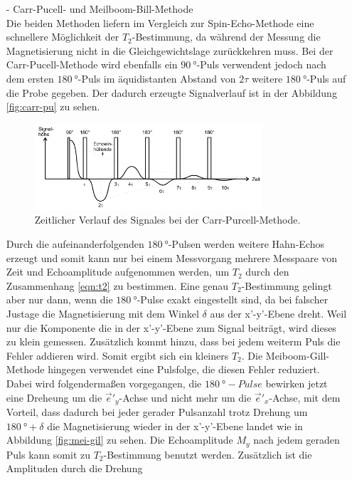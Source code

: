 \begin{itemize}
\item[-] Carr-Pucell- und Meilboom-Bill-Methode\\
Die beiden Methoden liefern im Vergleich zur Spin-Echo-Methode eine
schnellere Möglichkeit der $T_2$-Bestimmung, da während der Messung die Magnetisierung
nicht in die Gleichgewichtslage zurückkehren muss.
Bei der Carr-Pucell-Methode wird ebenfalls ein $\SI{90}{\degree}$-Puls
verwendent jedoch nach dem ersten $\SI{180}{\degree}$-Puls
im äquidistanten Abstand von $2\tau$ weitere $\SI{180}{\degree}$-Puls
auf die Probe gegeben. Der dadurch erzeugte Signalverlauf
ist in der Abbildung \ref{fig:carr-pu} zu sehen.

\begin{figure}
  \includegraphics[width=0.8\textwidth]{carr-pu.PNG}
  \caption{Zeitlicher Verlauf des Signales bei der Carr-Purcell-Methode.}
  \label{fig:tau_ver}
\end{figure}
Durch die aufeinanderfolgenden $\SI{180}{\degree}$-Pulsen werden
weitere Hahn-Echos erzeugt und
somit kann nur bei einem Messvorgang mehrere Messpaare von Zeit und
Echoamplitude aufgenommen werden, um $T_2$ durch den Zusammenhang \eqref{eqn:t2} zu bestimmen.
Eine genau $T_2$-Bestimmung gelingt aber nur dann,
wenn die $\SI{180}{\degree}$-Pulse exakt eingestellt sind, da
bei falscher Justage die Magnetisierung mit dem Winkel $\delta$ aus der x'-y'-Ebene
dreht. Weil nur die Komponente die in der x'-y'-Ebene zum Signal beiträgt,
wird dieses zu klein gemessen. Zusätzlich kommt hinzu, dass
bei jedem weiterm Puls die Fehler addieren wird.
Somit ergibt sich ein kleiners $T_2$.
Die Meiboom-Gill-Methode hingegen verwendet eine
Pulsfolge, die diesen Fehler reduziert. Dabei wird folgendermaßen
vorgegangen, die $\SI{180}{\degree}-Pulse$ bewirken
jetzt eine Dreheung um die $\vec{e}'_y$-Achse und nicht mehr
um die $\vec{e}'_x$-Achse, mit dem Vorteil, dass dadurch bei jeder
gerader Pulsanzahl trotz Drehung
um $\SI{180}{\degree}+\delta$ die Magnetisierung wieder in der x'-y'-Ebene
landet wie in Abbildung \ref{fig:mei-gil} zu sehen.
Die Echoamplitude $M_y$ nach jedem geraden Puls kann somit zu
$T_2$-Bestimmung benutzt werden.
Zusätzlich ist die Amplituden durch die Drehung

\end{itemize}
